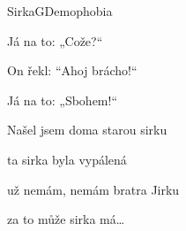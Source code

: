 \begin{song}{Sirka}{G}{Demophobia}
\begin{SBChorus*}
\begin{itshape}
Já na to: „Cože?“

On řekl: “Ahoj brácho!“

Já na to: „Sbohem!“
\end{itshape}
\end{SBChorus*}

\begin{SBChorus*}

Našel jsem doma starou sirku

ta sirka byla vypálená

už nemám, nemám bratra Jirku

za to může sirka má…

\end{SBChorus*}

\end{song}

\pagebreak
